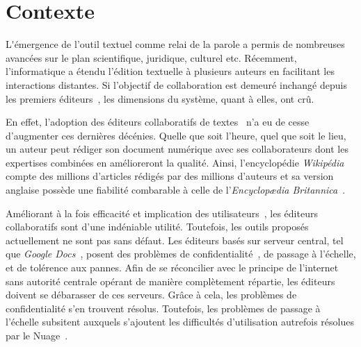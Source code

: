 
\section{Contexte}

\lettrine{L}'émergence de l'outil textuel comme relai de la parole a permis de
nombreuses avancées sur le plan scientifique, juridique, culturel
etc. Récemment, l'informatique a étendu l'édition textuelle à plusieurs auteurs
en facilitant les interactions distantes. Si l'objectif de collaboration est
demeuré inchangé depuis les premiers éditeurs~\cite{engelbart1968research}, les
dimensions du système, quant à elles, ont crû.

En effet, l'adoption des éditeurs collaboratifs de
textes~\cite{ellis1991groupware} n'a eu de cesse d'augmenter ces dernières
décénies. Quelle que soit l'heure, quel que soit le lieu, un auteur peut rédiger
son document numérique avec ses collaborateurs dont les expertises combinées en
amélioreront la qualité. Ainsi, l'encyclopédie \emph{Wikipédia} compte des
millions d'articles rédigés par des millions d'auteurs et sa version anglaise
possède une fiabilité combarable à celle de l'\emph{Encyclop\ae{}dia
  Britannica}~\cite{giles2005internet}.

Améliorant à la fois efficacité et implication des
utilisateurs~\cite{noel2004empirical}, les éditeurs collaboratifs sont d'une
indéniable utilité. Toutefois, les outils proposés actuellement ne sont pas sans
défaut. Les éditeurs basés sur serveur central, tel que \emph{Google
  Docs}~\cite{googledocs}, posent des problèmes de
confidentialité~\cite{gellman2013us}, de passage à l'échelle, et de tolérence
aux pannes.
Afin de se réconcilier avec le principe de l'internet sans autorité centrale
opérant de manière complètement répartie, les éditeurs doivent se débarasser de
ces serveurs. Grâce à cela, les problèmes de confidentialité s'en trouvent
résolus. Toutefois, les problèmes de passage à l'échelle subsitent auxquels
s'ajoutent les difficultés d'utilisation autrefois résolues par le
Nuage~\cite{mell2011national}.


